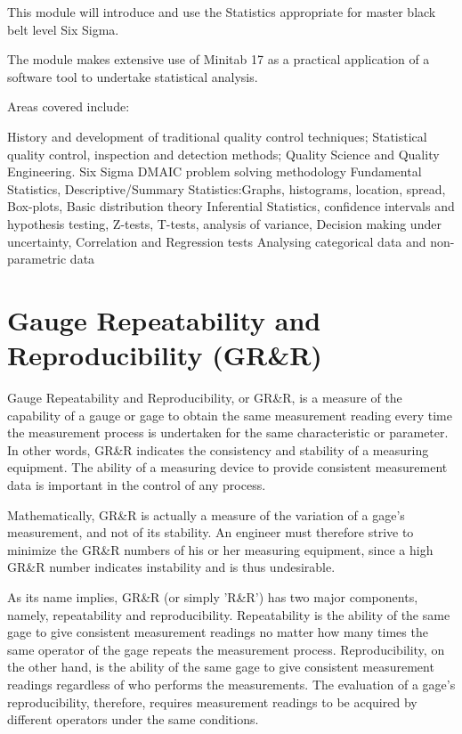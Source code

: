 \documentclass[]{article}
\begin{document}
\maketitle
This module will introduce and use the Statistics appropriate for master black belt level Six Sigma.

The module makes extensive use of Minitab 17 as a practical application of a software tool to undertake statistical analysis.

Areas covered include:

History and development of traditional quality control techniques; Statistical quality control, inspection and detection methods; Quality Science and Quality Engineering.
Six Sigma DMAIC problem solving methodology
Fundamental Statistics, Descriptive/Summary Statistics:Graphs, histograms, location, spread, Box-plots, Basic distribution theory
Inferential Statistics, confidence intervals and hypothesis testing, Z-tests, T-tests, analysis of variance, Decision making under uncertainty,  Correlation and Regression tests
Analysing categorical data and non-parametric data

\section{Gauge Repeatability and Reproducibility (GR\&R)}
  
Gauge Repeatability and Reproducibility, or GR\&R, is a measure of the capability of a gauge or gage to obtain the same measurement reading every time the measurement process is undertaken for the same characteristic or parameter.  In other words, GR\&R indicates the consistency and stability of a measuring equipment. The ability of a measuring device to provide consistent measurement data is important in the control of any process.
  
Mathematically, GR\&R is actually a measure of the variation of a gage's measurement, and not of its stability.  An engineer must therefore strive to minimize the GR\&R numbers of his or her measuring equipment, since a high GR\&R number indicates instability and is thus undesirable.
          
As its name implies, GR\&R (or simply 'R\&R') has two major components, namely, repeatability and reproducibility. Repeatability is the ability of the same gage to give consistent measurement readings no matter how many times the same operator of the gage repeats the measurement process.  Reproducibility, on the other hand, is the ability of the same gage to give consistent measurement readings regardless of who performs the measurements.  The evaluation of a gage's reproducibility, therefore, requires measurement readings to be acquired by different operators under the same conditions.
  
\end{document}
